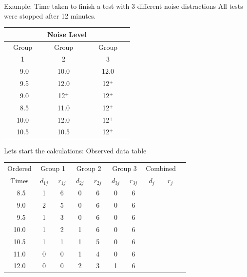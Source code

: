 \documentclass[envcountsect, 10pt, portrait, palatino]{beamer}
\begin{document}
\begin{frame}{Example: Time taken to finish a test with 3 different noise distractions}
All tests were stopped after 12 minutes.

\begin{center}
\begin{tabular}{ccc}
\hline \hline
 \multicolumn{3}{c}{Noise Level}\\ \hline
Group & Group & Group \\
~~~~1~~~~ & ~~~~~2~~~~~ & ~~~~~3~~~~~ \\ \hline
~9.0   & 10.0    &  12.0  \\
~9.5   & 12.0    &  12$^+$\\
~9.0   & 12$^+$  &  12$^+$\\
~8.5   & 11.0    &  12$^+$\\
10.0   & 12.0    &  12$^+$\\
10.5   & 10.5    &  12$^+$\\  \hline \hline
\end{tabular}
\end{center}
\normalsize
\end{frame}

\begin{frame}{Lets start the calculations: Observed data table}

\small
\begin{center}
\begin{tabular}{cccccccccc}
\hline
Ordered     & \multicolumn{2}{c}{Group 1}& \multicolumn{2}{c}{Group 2}
&  \multicolumn{2}{c}{Group 3} &\multicolumn{2}{c}{Combined}  \\
\cline{2-3} \cline{4-5} \cline{6-7}
Times & $~d_{1j}~$ & $~r_{1j}~$  & $~d_{2j}~$ & $~r_{2j}~$  &
$~d_{3j}~$ & $~r_{3j}~$  & $~d_{j}~$ & $~r_{j}~$ &\\ \hline
~8.5   & 1 & 6  & 0 & 6 & 0 & 6 \\
~9.0     & 2 & 5  & 0 & 6 & 0 & 6\\
~9.5   & 1 & 3  & 0 & 6 & 0 & 6\\
10.0    & 1 & 2  & 1 & 6 & 0 & 6\\
10.5  & 1 & 1  & 1 & 5 & 0 & 6\\
11.0    & 0  &0  & 1 & 4 & 0 & 6\\
12.0    & 0  &0  & 2 & 3 & 1 & 6\\ \hline
\end{tabular}
\end{center}
\end{frame}
\end{document}
